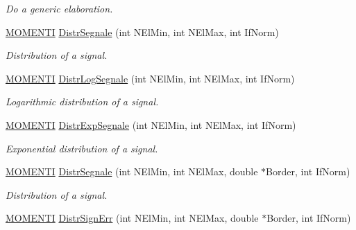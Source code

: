 \begin{DoxyCompactItemize}
\begin{DoxyCompactList}\small\item\em \-Do a generic elaboration. \end{DoxyCompactList}\item 
\hypertarget{classVarDatFile_a176c9a10a842e30206fe1ebece6917dc}{\hyperlink{structMOMENTI}{\-M\-O\-M\-E\-N\-T\-I} \hyperlink{classVarDatFile_a176c9a10a842e30206fe1ebece6917dc}{\-Distr\-Segnale} (int \-N\-El\-Min, int \-N\-El\-Max, int \-If\-Norm)}\label{classVarDatFile_a176c9a10a842e30206fe1ebece6917dc}

\begin{DoxyCompactList}\small\item\em \-Distribution of a signal. \end{DoxyCompactList}\item 
\hypertarget{classVarDatFile_a82c1693acb4e233005f36e72e10d8f84}{\hyperlink{structMOMENTI}{\-M\-O\-M\-E\-N\-T\-I} \hyperlink{classVarDatFile_a82c1693acb4e233005f36e72e10d8f84}{\-Distr\-Log\-Segnale} (int \-N\-El\-Min, int \-N\-El\-Max, int \-If\-Norm)}\label{classVarDatFile_a82c1693acb4e233005f36e72e10d8f84}

\begin{DoxyCompactList}\small\item\em \-Logarithmic distribution of a signal. \end{DoxyCompactList}\item 
\hypertarget{classVarDatFile_a368bdb3c4de9a07c0ce1ea7edb331778}{\hyperlink{structMOMENTI}{\-M\-O\-M\-E\-N\-T\-I} \hyperlink{classVarDatFile_a368bdb3c4de9a07c0ce1ea7edb331778}{\-Distr\-Exp\-Segnale} (int \-N\-El\-Min, int \-N\-El\-Max, int \-If\-Norm)}\label{classVarDatFile_a368bdb3c4de9a07c0ce1ea7edb331778}

\begin{DoxyCompactList}\small\item\em \-Exponential distribution of a signal. \end{DoxyCompactList}\item 
\hypertarget{classVarDatFile_a86ca74545b082ee1b6fc140c2d56b943}{\hyperlink{structMOMENTI}{\-M\-O\-M\-E\-N\-T\-I} \hyperlink{classVarDatFile_a86ca74545b082ee1b6fc140c2d56b943}{\-Distr\-Segnale} (int \-N\-El\-Min, int \-N\-El\-Max, double $\ast$\-Border, int \-If\-Norm)}\label{classVarDatFile_a86ca74545b082ee1b6fc140c2d56b943}

\begin{DoxyCompactList}\small\item\em \-Distribution of a signal. \end{DoxyCompactList}\item 
\hypertarget{classVarDatFile_a418f05ea3f8e69dbc49adeccddbb8d66}{\hyperlink{structMOMENTI}{\-M\-O\-M\-E\-N\-T\-I} \hyperlink{classVarDatFile_a418f05ea3f8e69dbc49adeccddbb8d66}{\-Distr\-Sign\-Err} (int \-N\-El\-Min, int \-N\-El\-Max, double $\ast$\-Border, int \-If\-Norm)}\label{classVarDatFile_a418f05ea3f8e69dbc49adeccddbb8d66}


\end{DoxyCompactItemize}
